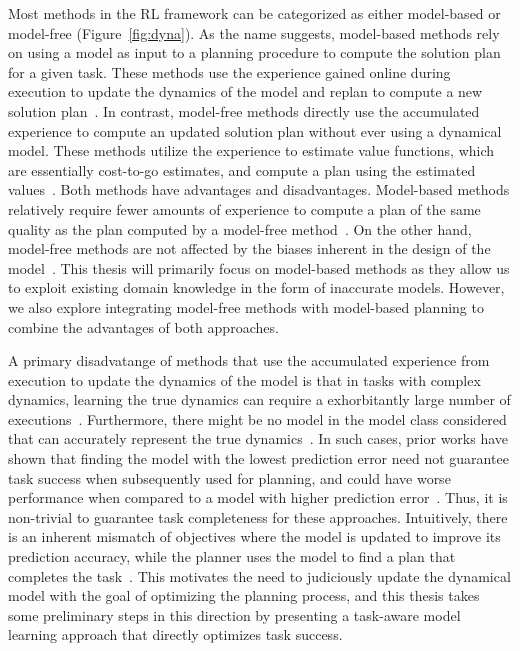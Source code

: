 Most methods in the RL framework can be categorized as either model-based
or model-free (Figure~\ref{fig:dyna}). As the name suggests, model-based methods rely on
using a model as input to a planning procedure to compute the solution
plan for a given task. These methods use the experience gained online
during execution to update the dynamics of the model and replan to
compute a new solution plan~\cite{DBLP:journals/sigart/Sutton91}. In
contrast, model-free methods directly 
use the accumulated experience to compute an updated solution plan
without ever using a dynamical model. These methods utilize the
experience to estimate value functions, which are essentially
cost-to-go estimates, and compute a plan using the estimated
values~\cite{DBLP:journals/ml/WatkinsD92}. Both methods have advantages and disadvantages. Model-based
methods relatively require fewer amounts of experience to compute a
plan of the same quality as the plan computed by a model-free
method~\cite{DBLP:conf/colt/SunJKA019}. On the other hand, model-free methods are not affected by the biases
inherent in the design of the model~\cite{deisenroth2010reducing}.
This thesis will primarily focus on model-based methods as they allow us
to exploit existing domain knowledge in the form of inaccurate models. However,
we also explore integrating model-free methods with model-based planning to
combine the advantages of both approaches.

A primary disadvatange of methods that use the accumulated experience from
execution to update the dynamics of the model is that in tasks with complex
dynamics, learning the true dynamics can require a exhorbitantly large number of
executions~\cite{DBLP:journals/corr/abs-1907-02057,
  DBLP:conf/icra/NagabandiKFL18, DBLP:journals/corr/abs-1911-08265}.
Furthermore, there might be no model in the
model class considered
that can accurately represent the true dynamics~\cite{DBLP:conf/icra/JosephGRHR13}. In such cases, prior works have
shown that finding the model with the lowest prediction error need not guarantee
task success when subsequently used for planning, and could have worse
performance when compared to a model with higher prediction
error~\cite{Farahmand2018, grimm2020value}. Thus, it is non-trivial to
guarantee task completeness for these approaches. Intuitively, there is an
inherent mismatch of objectives where the model is updated to improve its
prediction accuracy, while the planner uses the model to find a plan that completes the task~\cite{DBLP:conf/l4dc/LambertAYC20}.
This motivates the need to judiciously update the dynamical model with the goal
of optimizing the planning process, and this thesis takes some preliminary steps
in this direction by presenting a task-aware model learning approach that directly
optimizes task success.

